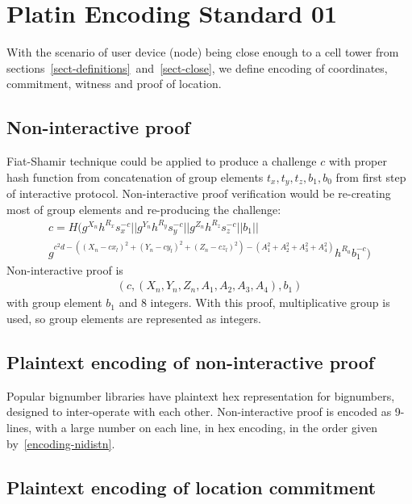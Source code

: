 \documentclass[a4paper,12pt]{article}
\begin{document}
\section{Platin Encoding Standard 01}

With the scenario of user device (node) being close enough to a cell tower
from sections~\ref{sect-definitions}~and~\ref{sect-close},
we define encoding of coordinates, commitment, witness and proof of location.

\subsection{Non-interactive proof}
Fiat-Shamir technique could be applied to produce a challenge $c$
with proper hash function from concatenation of group elements
$t_x, t_y, t_z, b_1, b_0$ from first step of interactive protocol.
Non-interactive proof verification would be
re-creating most of group elements and
re-producing the challenge:
\begin{multline}
  \label{verf-nidistn}
  c = H(g^{X_n} h^{R_x} s_x^{-c} || g^{Y_n} h^{R_y} s_y^{-c} || g^{Z_n} h^{R_z} s_z^{-c} || b_1 || \\
        g^{c^2 d - ((X_n - c x_l)^2 + (Y_n - c y_l)^2 + (Z_n - c z_l)^2 ) - (A_1^2 + A_2^2 + A_3^2 + A_4^2)} h^{R_a} b_1^{-c})
\end{multline}
Non-interactive proof is
\begin{gather}
\label{encoding-nidistn}
  (c, (X_n, Y_n, Z_n, A_1, A_2, A_3, A_4), b_1)
\end{gather}
with group element $b_1$ and 8 integers.
With this proof, multiplicative group is used, so group elements are represented as integers.

\subsection{Plaintext encoding of non-interactive proof}

Popular bignumber libraries have plaintext hex representation for bignumbers,
designed to inter-operate with each other.
Non-interactive proof is encoded as 9-lines,
with a large number on each line, in hex encoding,
in the order given by~\eqref{encoding-nidistn}.

\subsection{Plaintext encoding of location commitment}
\end{document}
